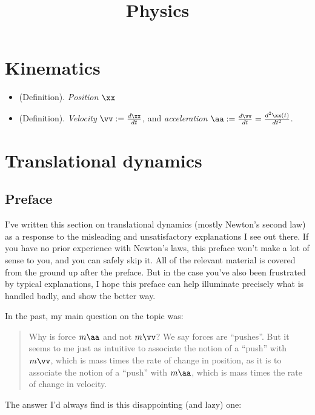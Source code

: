 \documentclass{article}
\title{Physics}
\date{}
\begin{document}
\maketitle

\section*{Kinematics}

\begin{itemize}
    \item (Definition). \textit{Position} $\xx$
    \item (Definition). \textit{Velocity} $\vv := \frac{d\xx}{dt}$, and \textit{acceleration} $\aa := \frac{d\vv}{dt} = \frac{d^2\xx(t)}{dt^2}$.
\end{itemize}

\newpage

\section*{Translational dynamics}

\subsection*{Preface}

I’ve written this section on translational dynamics (mostly Newton's second law) as a response to the misleading and unsatisfactory explanations I see out there. If you have no prior experience with Newton's laws, this preface won't make a lot of sense to you, and you can safely skip it. All of the relevant material is covered from the ground up after the preface. But in the case you've also been frustrated by typical explanations, I hope this preface can help illuminate precisely what is handled badly, and show the better way.

In the past, my main question on the topic was:

\begin{quote}
    Why is force $m\aa$ and not $m\vv$? We say forces are ``pushes''. But it seems to me just as intuitive to associate the notion of a ``push'' with $m\vv$, which is mass times the rate of change in position, as it is to associate the notion of a ``push'' with $m\aa$, which is mass times the rate of change in velocity.
\end{quote}

The answer I’d always find is this disappointing (and lazy) one:
\end{document}
